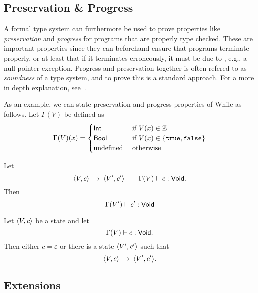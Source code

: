 \subsection{Preservation \& Progress}
\label{sub:preservation_&_progress}

A formal type system can furthermore be used to prove properties like
\emph{preservation} and \emph{progress} for programs that are properly type
checked. These are important properties since they can beforehand ensure that
programs terminate properly, or at least that if it terminates erroneously, it
must be due to , e.g., a null-pointer exception. Progress and preservation
together is often refered to as \emph{soundness} of a type system, and to prove this
is a standard approach. For a more in depth explanation,
see~\parencite{pierce2002types}.

As an example, we can state preservation and progress properties of While as follows. Let
$\Gamma(V)$ be defined as 
\[
  \Gamma(V)(x) = \begin{cases}
    \mbox{$\mathsf{Int}$} & \text{ if } V(x) \in \mathbb{Z} \\
    \mbox{$\mathsf{Bool}$} & \text{ if } V(x) \in \left\{\mbox{\texttt{true}}, \mbox{\texttt{false}} \right\} \\
    \text{undefined} & \text{ otherwise }
  \end{cases}
\]
\begin{proposition} 
  Let
  \begin{equation*}
    \langle V, c \rangle \: \rightarrow \: \langle V', c' \rangle \quad\quad \Gamma(V) \vdash
    c: \mbox{$\mathsf{Void}$}.
  \end{equation*}
  Then 
  \begin{equation*}
    \Gamma(V') \vdash c': \mbox{$\mathsf{Void}$}
  \end{equation*}
\end{proposition}
\begin{proposition}
  Let $\langle V, c \rangle$ be a state and let
  \begin{equation*}
    \Gamma(V) \vdash c: \mbox{$\mathsf{Void}$}.
  \end{equation*}
  Then either $c = \varepsilon$ or there is a state $\langle V', c' \rangle$ such that
  \begin{equation*}
    \langle V, c \rangle \: \rightarrow \: \langle V', c' \rangle.
  \end{equation*}
\end{proposition}


\subsection{Extensions}
\label{sub:extensions}

